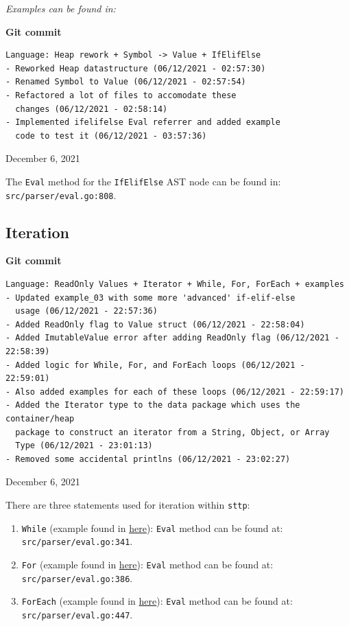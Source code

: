 \documentclass[]{full}
\theoremstyle{definition}
\begin{document}
\textit{Examples can be found in: }

\begin{center}
    \textbf{Git commit}
    \begin{verbatim}
Language: Heap rework + Symbol -> Value + IfElifElse
- Reworked Heap datastructure (06/12/2021 - 02:57:30)
- Renamed Symbol to Value (06/12/2021 - 02:57:54)
- Refactored a lot of files to accomodate these 
  changes (06/12/2021 - 02:58:14)
- Implemented ifelifelse Eval referrer and added example
  code to test it (06/12/2021 - 03:57:36)
    \end{verbatim}
    \vspace{-1em}
    \tiny{December 6, 2021}
\end{center}

The \verb|Eval| method for the \verb|IfElifElse| AST node can be found in: \verb|src/parser/eval.go:808|.

\subsection{Iteration}

\begin{center}
    \textbf{Git commit}
    \begin{verbatim}
Language: ReadOnly Values + Iterator + While, For, ForEach + examples
- Updated example_03 with some more 'advanced' if-elif-else 
  usage (06/12/2021 - 22:57:36)
- Added ReadOnly flag to Value struct (06/12/2021 - 22:58:04)
- Added ImutableValue error after adding ReadOnly flag (06/12/2021 - 22:58:39)
- Added logic for While, For, and ForEach loops (06/12/2021 - 22:59:01)
- Also added examples for each of these loops (06/12/2021 - 22:59:17)
- Added the Iterator type to the data package which uses the container/heap
  package to construct an iterator from a String, Object, or Array
  Type (06/12/2021 - 23:01:13)
- Removed some accidental printlns (06/12/2021 - 23:02:27)
    \end{verbatim}
    \vspace{-1em}
    \tiny{December 6, 2021}
\end{center}

There are three statements used for iteration within \verb|sttp|:

\begin{enumerate}
    \item \verb|While| (example found in \hyperref[appendix:sttp-examples-4]{here}): \verb|Eval| method can be found at: \verb|src/parser/eval.go:341|.
    \item \verb|For| (example found in \hyperref[appendix:sttp-examples-5]{here}): \verb|Eval| method can be found at: \verb|src/parser/eval.go:386|.
    \item \verb|ForEach| (example found in \hyperref[appendix:sttp-examples-6]{here}): \verb|Eval| method can be found at: \verb|src/parser/eval.go:447|.
\end{enumerate}
\end{document}
